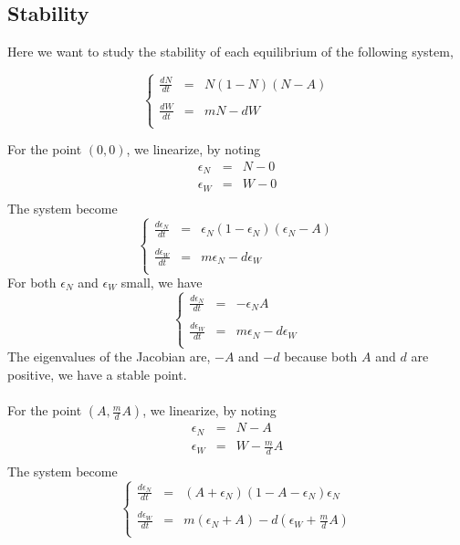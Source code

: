 \documentclass{article}
\begin{document}
\subsection{Stability}

Here we want to study the stability of each equilibrium of the following system,

\[
\left\lbrace
\begin{array}{rcl}
\frac{dN}{dt} & = & N(1-N)(N-A) \\
\\
\frac{dW}{dt} & = & mN -dW \\
\end{array}
\right.
\]

For the point $(0,0)$, we linearize, by noting 
\[
\begin{array}{rcl}
\epsilon_N & = & N - 0 \\
\epsilon_W & = & W - 0 \\
\end{array}
\]
The system become
\[
\left\lbrace
\begin{array}{rcl}
\frac{d\epsilon_N}{dt} & = & \epsilon_N(1-\epsilon_N)(\epsilon_N-A) \\
\\
\frac{d\epsilon_W}{dt} & = & m\epsilon_N -d\epsilon_W \\
\end{array}
\right.
\]
For both $\epsilon_N$ and $\epsilon_W$ small, we have
\[
\left\lbrace
\begin{array}{rcl}
\frac{d\epsilon_N}{dt} & = & -\epsilon_N A \\
\\
\frac{d\epsilon_W}{dt} & = & m\epsilon_N -d\epsilon_W \\
\end{array}
\right.
\]
The eigenvalues of the Jacobian are, $-A$ and $-d$ because both $A$ and $d$ are positive, we have a stable point.
\\
\\
For the point $(A,\frac{m}{d}A)$, we linearize, by noting 
\[
\begin{array}{rcl}
\epsilon_N & = & N - A \\
\epsilon_W & = & W - \frac{m}{d}A \\
\end{array}
\]
The system become
\[
\left\lbrace
\begin{array}{rcl}
\frac{d\epsilon_N}{dt} & = & (A+\epsilon_N)(1-A-\epsilon_N)\epsilon_N \\
\\
\frac{d\epsilon_W}{dt} & = & m(\epsilon_N+A) -d(\epsilon_W+\frac{m}{d}A) \\
\end{array}
\right.
\]
\end{document}
